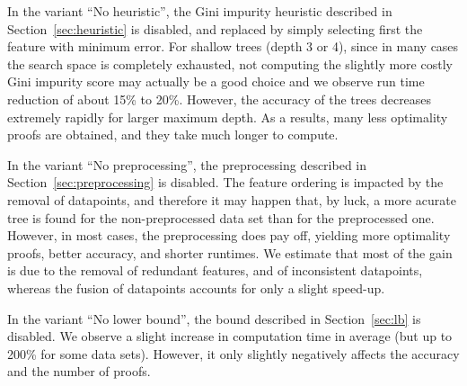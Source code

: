 \documentclass{article}
\begin{document}
In the variant ``No heuristic'', the Gini impurity heuristic described in Section~\ref{sec:heuristic} is disabled, and replaced by simply selecting first the feature with minimum error. For shallow trees (depth 3 or 4), since in many cases the search space is completely exhausted, not computing the slightly more costly Gini impurity score may actually be a good choice and we observe run time reduction of about 15\% to 20\%. However, the accuracy of the trees decreases extremely rapidly for larger maximum depth. As a results, many less optimality proofs are obtained, and they take much longer to compute.

In the variant ``No preprocessing'', the preprocessing described in Section~\ref{sec:preprocessing} is disabled. The feature ordering is impacted by the removal of datapoints, and therefore it may happen that, by luck, a more acurate tree is found for the non-preprocessed data set than for the preprocessed one. However, in most cases, the preprocessing does pay off, yielding more optimality proofs, better accuracy, and shorter runtimes. We estimate that most of the gain is due to the removal of redundant features, and of inconsistent datapoints, whereas the fusion of datapoints accounts for only a slight speed-up.

In the variant ``No lower bound'', the bound described in Section~\ref{sec:lb} is disabled. We observe a slight increase in computation time in average (but up to 200\% for some data sets). However, 
it only slightly negatively affects the accuracy and the number of proofs.

% 
\end{document}
